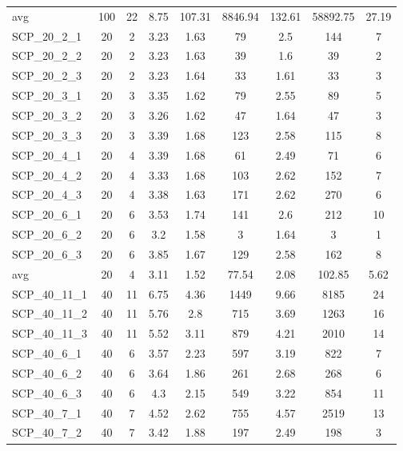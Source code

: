 \begin{table}[!ht]
{\begin{tabular}{lcccccccc}
\cline{1-9} avg & 100 & 22 & 8.75 & 107.31& 8846.94 & 132.61& 58892.75 & 27.19\\ \cline{1-9}
SCP\_20\_2\_1 & 20 & 2 & 3.23 &  \textcolor{blue2}{1.63} & 79 & 2.5 & 144 & 7 \\
SCP\_20\_2\_2 & 20 & 2 & 3.23 & 1.63 & 39 &  \textcolor{blue2}{1.6} & 39 & 2 \\
SCP\_20\_2\_3 & 20 & 2 & 3.23 & 1.64 & 33 &  \textcolor{blue2}{1.61} & 33 & 3 \\
SCP\_20\_3\_1 & 20 & 3 & 3.35 &  \textcolor{blue2}{1.62} & 79 & 2.55 & 89 & 5 \\
SCP\_20\_3\_2 & 20 & 3 & 3.26 &  \textcolor{blue2}{1.62} & 47 & 1.64 & 47 & 3 \\
SCP\_20\_3\_3 & 20 & 3 & 3.39 &  \textcolor{blue2}{1.68} & 123 & 2.58 & 115 & 8 \\
SCP\_20\_4\_1 & 20 & 4 & 3.39 &  \textcolor{blue2}{1.68} & 61 & 2.49 & 71 & 6 \\
SCP\_20\_4\_2 & 20 & 4 & 3.33 &  \textcolor{blue2}{1.68} & 103 & 2.62 & 152 & 7 \\
SCP\_20\_4\_3 & 20 & 4 & 3.38 &  \textcolor{blue2}{1.63} & 171 & 2.62 & 270 & 6 \\
SCP\_20\_6\_1 & 20 & 6 & 3.53 &  \textcolor{blue2}{1.74} & 141 & 2.6 & 212 & 10 \\
SCP\_20\_6\_2 & 20 & 6 & 3.2 &  \textcolor{blue2}{1.58} & 3 & 1.64 & 3 & 1 \\
SCP\_20\_6\_3 & 20 & 6 & 3.85 &  \textcolor{blue2}{1.67} & 129 & 2.58 & 162 & 8 \\
\cline{1-9} avg & 20 & 4 & 3.11 & 1.52& 77.54 & 2.08& 102.85 & 5.62\\ \cline{1-9}
SCP\_40\_11\_1 & 40 & 11 & 6.75 &  \textcolor{blue2}{4.36} & 1449 & 9.66 & 8185 & 24 \\
SCP\_40\_11\_2 & 40 & 11 & 5.76 &  \textcolor{blue2}{2.8} & 715 & 3.69 & 1263 & 16 \\
SCP\_40\_11\_3 & 40 & 11 & 5.52 &  \textcolor{blue2}{3.11} & 879 & 4.21 & 2010 & 14 \\
SCP\_40\_6\_1 & 40 & 6 & 3.57 &  \textcolor{blue2}{2.23} & 597 & 3.19 & 822 & 7 \\
SCP\_40\_6\_2 & 40 & 6 & 3.64 &  \textcolor{blue2}{1.86} & 261 & 2.68 & 268 & 6 \\
SCP\_40\_6\_3 & 40 & 6 & 4.3 &  \textcolor{blue2}{2.15} & 549 & 3.22 & 854 & 11 \\
SCP\_40\_7\_1 & 40 & 7 & 4.52 &  \textcolor{blue2}{2.62} & 755 & 4.57 & 2519 & 13 \\
SCP\_40\_7\_2 & 40 & 7 & 3.42 &  \textcolor{blue2}{1.88} & 197 & 2.49 & 198 & 3 \\

\end{tabular}}
\end{table}
